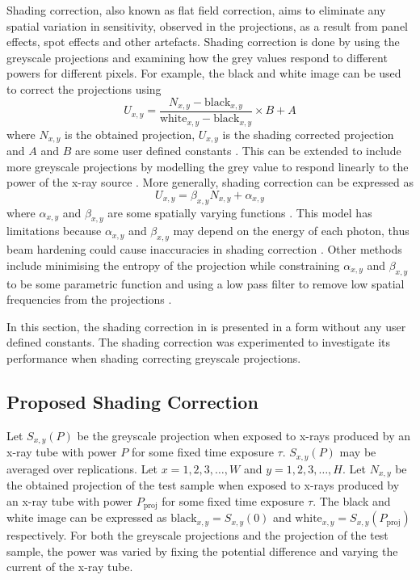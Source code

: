 Shading correction, also known as flat field correction, aims to eliminate any spatial variation in sensitivity, observed in the projections, as a result from panel effects, spot effects and other artefacts. Shading correction is done by using the greyscale projections and examining how the grey values respond to different powers for different pixels. For example, the black and white image can be used to correct the projections using
\begin{equation}
U_{x,y} = \dfrac{N_{x,y}-\text{black}_{x,y}}{\text{white}_{x,y}-\text{black}_{x,y}}\times B+A
\label{eq:data_shadingCorrectionOld}
\end{equation}
where $N_{x,y}$ is the obtained projection, $U_{x,y}$ is the shading corrected projection and $A$ and $B$ are some user defined constants \citep{young2000shading, munzenmayer2003enhancing}. This can be extended to include more greyscale projections by modelling the grey value to respond linearly to the power of the x-ray source \citep{seibert1998flat}. More generally, shading correction can be expressed as
\begin{equation}
U_{x,y} = \beta_{x,y} N_{x,y} + \alpha_{x,y}
\end{equation}
where $\alpha_{x,y}$ and $\beta_{x,y}$ are some spatially varying functions \citep{munzenmayer2003enhancing}. This model has limitations because $\alpha_{x,y}$ and $\beta_{x,y}$ may depend on the energy of each photon, thus beam hardening could cause inaccuracies in shading correction \citep{davidson2003limitations}. Other methods include minimising the entropy of the projection while constraining $\alpha_{x,y}$ and $\beta_{x,y}$ to be some parametric function \citep{likar2000retrospective} and using a low pass filter to remove low spatial frequencies from the projections \citep{young2000shading, munzenmayer2003enhancing}.

In this section, the shading correction in \cite{seibert1998flat} is presented in a form without any user defined constants. The shading correction was experimented to investigate its performance when shading correcting greyscale projections.

\subsection{Proposed Shading Correction}

Let $S_{x,y}(P)$ be the greyscale projection when exposed to x-rays produced by an x-ray tube with power $P$ for some fixed time exposure $\tau$. $S_{x,y}(P)$ may be averaged over replications. Let $x=1,2,3,\dotsc, W$ and $y=1,2,3,\dotsc,H$. Let $N_{x,y}$ be the obtained projection of the test sample when exposed to x-rays produced by an x-ray tube with power $P_\text{proj}$ for some fixed time exposure $\tau$. The black and white image can be expressed as $\text{black}_{x,y}=S_{x,y}(0)$ and $\text{white}_{x,y}=S_{x,y}(P_\text{proj})$ respectively. For both the greyscale projections and the projection of the test sample, the power was varied by fixing the potential difference and varying the current of the x-ray tube.


